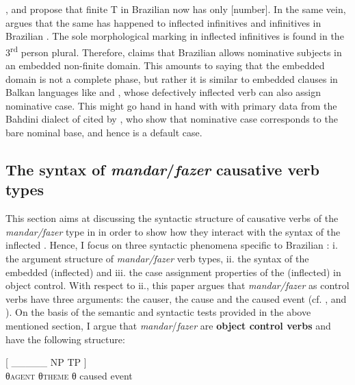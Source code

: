 \documentclass[output=paper]{langsci/langscibook}
\begin{document}
\citet{Nunes2008}, \citet{Ferreira2009} and \citet{Rodrigues2004} propose that finite T in Brazilian  now has only [number]. In the same vein, \citet{Cyrino2010} argues that the same has happened to inflected infinitives and  infinitives in Brazilian . The sole morphological marking in inflected infinitives is found in the 3\textsuperscript{rd} person plural. Therefore, \citet{Cyrino2010} claims that Brazilian  allows nominative subjects in an embedded non-finite domain. This amounts to saying that the embedded domain is not a complete phase, but rather it is similar to embedded  clauses in Balkan languages like  and , whose defectively inflected verb can also assign nominative case. This might go hand in hand with with primary data from the Bahdini dialect of   cited by \citet{Manzini2017}, who show that nominative case corresponds to the bare nominal base, and hence is a default case.  

\subsection{The syntax of \textit{mandar}/\textit{fazer} causative verb types} %

This section aims at discussing the syntactic structure of causative verbs of the \textit{mandar\slash fazer} type in  in order to show how they interact with the syntax of the inflected .\textbf{ }Hence, I focus on three syntactic phenomena specific to Brazilian : i. the argument structure of \textit{mandar\slash fazer}\textbf{ }verb types, ii. the syntax of the embedded (inflected)  and iii.\textbf{ }the case assignment properties of the (inflected)  in object control. With respect to ii., this paper argues that \textit{mandar\slash fazer} as control verbs have three arguments: the causer, the cause and the caused event (cf. \citealt{Zubizarreta1985}, \citealt{Alsina1992} and \citealt{Ippolito2000}). On the basis of the semantic and syntactic tests provided in the above mentioned section, I argue that \textit{mandar}/\textit{fazer} are \textbf{object control verbs} and have the following structure:

\ea%
    \label{ex:moreno:20}
     [     \_\_\_\_\_         NP                  TP ]\\
                  {}                                {}    {θ\textsc{agent}}  {θ\textsc{theme}}   {θ caused event} \\
    
\end{document}
